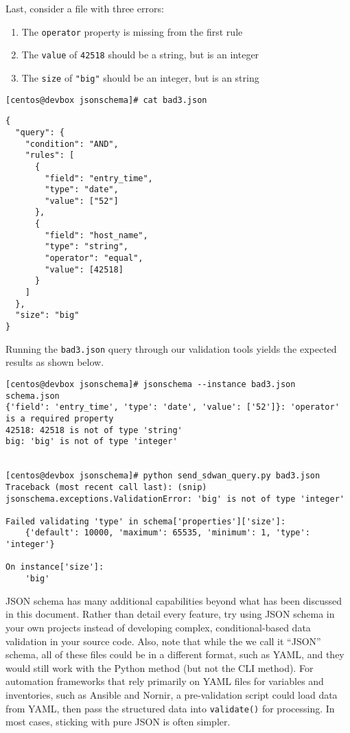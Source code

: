 Last, consider a file with three errors:

\begin{enumerate}
  \item The \verb|operator| property is missing from the first rule
  \item The \verb|value| of \verb|42518| should be a string, but is an integer
  \item The \verb|size| of \verb|"big"| should be an integer, but is an string
\end{enumerate}

\begin{verbatim}
[centos@devbox jsonschema]# cat bad3.json
\end{verbatim}

\begin{verbatim}
{
  "query": {
    "condition": "AND",
    "rules": [
      {
        "field": "entry_time",
        "type": "date",
        "value": ["52"]
      },
      {
        "field": "host_name",
        "type": "string",
        "operator": "equal",
        "value": [42518]
      }
    ]
  },
  "size": "big"
}
\end{verbatim}

Running the \verb|bad3.json| query through our validation tools yields the
expected results as shown below.

\begin{verbatim}
[centos@devbox jsonschema]# jsonschema --instance bad3.json schema.json
{'field': 'entry_time', 'type': 'date', 'value': ['52']}: 'operator' is a required property
42518: 42518 is not of type 'string'
big: 'big' is not of type 'integer'


[centos@devbox jsonschema]# python send_sdwan_query.py bad3.json
Traceback (most recent call last): (snip)
jsonschema.exceptions.ValidationError: 'big' is not of type 'integer'

Failed validating 'type' in schema['properties']['size']:
    {'default': 10000, 'maximum': 65535, 'minimum': 1, 'type': 'integer'}

On instance['size']:
    'big'
\end{verbatim}

JSON schema has many additional capabilities beyond what has been discussed
in this document. Rather than detail every feature, try using JSON schema
in your own projects instead of developing complex, conditional-based data
validation in your source code. Also, note that while the we call it ``JSON''
schema, all of these files could be in a different format, such as YAML,
and they would still work with the Python method (but not the CLI method).
For automation frameworks that rely primarily on YAML files for variables
and inventories, such as Ansible and Nornir, a pre-validation script could
load data from YAML, then pass the structured data into \verb|validate()|
for processing. In most cases, sticking with pure JSON is often simpler.

